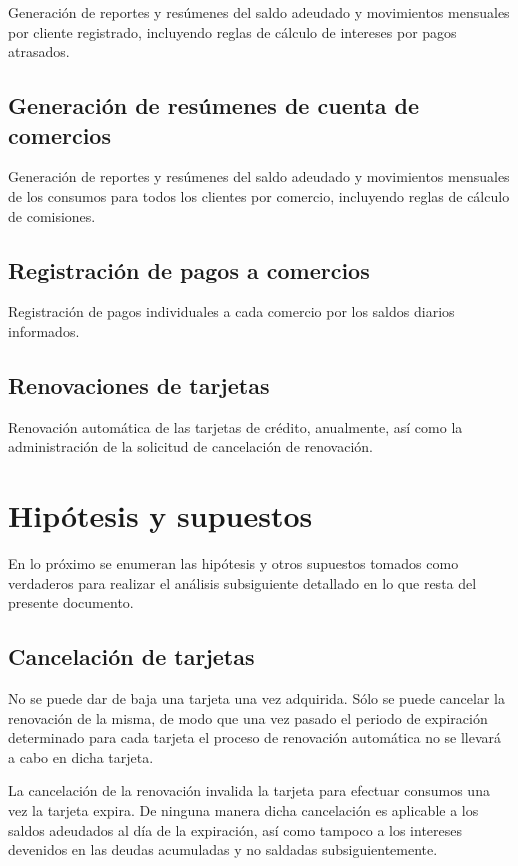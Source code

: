 Generación de reportes y resúmenes del saldo adeudado y movimientos mensuales por cliente registrado, incluyendo reglas de cálculo de intereses por pagos atrasados.

\subsection{Generación de resúmenes de cuenta de comercios}

Generación de reportes y resúmenes del saldo adeudado y movimientos mensuales de los consumos para todos los clientes por comercio, incluyendo reglas de cálculo de comisiones.

\subsection{Registración de pagos a comercios}

Registración de pagos individuales a cada comercio por los saldos diarios informados.

\subsection{Renovaciones de tarjetas}

Renovación automática de las tarjetas de crédito, anualmente, así como la administración de la solicitud de cancelación de renovación.


\section{Hipótesis y supuestos}

En lo próximo se enumeran las hipótesis y otros supuestos tomados como verdaderos para realizar el análisis subsiguiente detallado en lo que resta del presente documento.

\subsection{Cancelación de tarjetas}

No se puede dar de baja una tarjeta una vez adquirida. Sólo se puede cancelar la renovación de la misma, de modo que una vez pasado el periodo de expiración determinado para cada tarjeta el proceso de renovación automática no se llevará a cabo en dicha tarjeta.

La cancelación de la renovación invalida la tarjeta para efectuar consumos una vez la tarjeta expira. De ninguna manera dicha cancelación es aplicable a los saldos adeudados al día de la expiración, así como tampoco a los intereses devenidos en las deudas acumuladas y no saldadas subsiguientemente.


